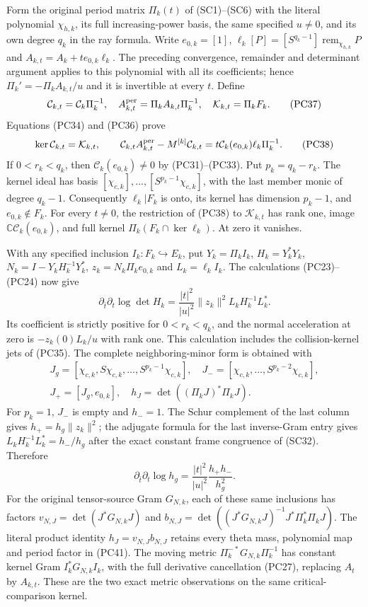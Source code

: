 Form the original period matrix $\Pi_k(t)$ of (SC1)--(SC6) with
the literal polynomial $\chi_{h,k}$, its full increasing-power basis,
the same specified $u\ne0$, and its own degree $q_k$ in the ray
formula.  Write $e_{0,k}=[1]$,
$\ell_k[P]=[S^{q_k-1}]\operatorname{rem}_{\chi_{h,k}}P$ and
$A_{k,t}=A_k+t e_{0,k}\ell_k$.  The preceding convergence,
remainder and determinant argument applies to this polynomial with
all its coefficients; hence $\Pi_k'=-\Pi_kA_{k,t}/u$ and it is
invertible at every $t$.  Define
\[
 \mathcal C_{k,t}=\mathcal C_k\Pi_k^{-1},\quad
 A_{k,t}^{\rm per}=\Pi_kA_{k,t}\Pi_k^{-1},\quad
 \mathcal K_{k,t}=\Pi_k F_k.
 \tag{PC37}
\]
Equations (PC34) and (PC36) prove
\[
 \ker\mathcal C_{k,t}=\mathcal K_{k,t},\qquad
 \mathcal C_{k,t}A_{k,t}^{\rm per}-M^{[k]}\mathcal C_{k,t}
       =t\mathcal C_k(e_{0,k})\ell_k\Pi_k^{-1}.
 \tag{PC38}
\]
If $0<r_k<q_k$, then $\mathcal C_k(e_{0,k})\ne0$ by
(PC31)--(PC33).  Put $p_k=q_k-r_k$.  The kernel ideal has basis
$[\chi_{c,k}],\ldots,[S^{p_k-1}\chi_{c,k}]$, with the last
member monic of degree $q_k-1$.  Consequently $\ell_k|F_k$ is
onto, its kernel has dimension $p_k-1$, and $e_{0,k}\notin F_k$.
For every $t\ne0$, the restriction of (PC38) to $\mathcal K_{k,t}$
has rank one, image $\mathbb C\mathcal C_k(e_{0,k})$, and full
kernel $\Pi_k(F_k\cap\ker\ell_k)$.  At zero it vanishes.

With any specified inclusion $I_k:F_k\hookrightarrow E_k$, put
$Y_k=\Pi_kI_k$, $H_k=Y_k^*Y_k$,
$N_k=I-Y_kH_k^{-1}Y_k^*$, $z_k=N_k\Pi_ke_{0,k}$ and
$L_k=\ell_kI_k$.  The calculations (PC23)--(PC24) now give
\[
 \boxed{\partial_{\bar t}\partial_t\log\det H_k
   =\frac{|t|^2}{|u|^2}\|z_k\|^2L_kH_k^{-1}L_k^*.}
 \tag{PC39}
\]
Its coefficient is strictly positive for $0<r_k<q_k$, and the
normal acceleration at zero is $-z_k(0)L_k/u$ with rank one.
This calculation includes the collision-kernel jets of (PC35).
The complete neighboring-minor form is obtained with
\[
 \begin{gathered}
 J_g=[\chi_{c,k},S\chi_{c,k},\ldots,S^{p_k-1}\chi_{c,k}],
 \quad J_-=[\chi_{c,k},\ldots,S^{p_k-2}\chi_{c,k}],\\
 J_+=[J_g,e_{0,k}],\quad
 h_J=\det((\Pi_kJ)^*\Pi_kJ).
 \end{gathered}
 \tag{PC40}
\]
For $p_k=1$, $J_-$ is empty and $h_-=1$.  The Schur complement
of the last column gives $h_+=h_g\|z_k\|^2$; the adjugate
formula for the last inverse-Gram entry gives
$L_kH_k^{-1}L_k^*=h_-/h_g$ after the exact constant frame
congruence of (SC32).  Therefore
\[
 \partial_{\bar t}\partial_t\log h_g
       =\frac{|t|^2}{|u|^2}\frac{h_+h_-}{h_g^2}.
 \tag{PC41}
\]
For the original tensor-source Gram $G_{N,k}$, each of these same
inclusions has factors
$v_{N,J}=\det(J^*G_{N,k}J)$ and
$b_{N,J}=\det((J^*G_{N,k}J)^{-1}J^*\Pi_k^*\Pi_kJ)$.
The literal product identity $h_J=v_{N,J}b_{N,J}$ retains every
theta mass, polynomial map and period factor in (PC41).
The moving metric $\Pi_k^{-*}G_{N,k}\Pi_k^{-1}$ has constant
kernel Gram $I_k^*G_{N,k}I_k$, with the full derivative cancellation
(PC27), replacing $A_t$ by $A_{k,t}$.  These are the two exact
metric observations on the same critical-comparison kernel.

